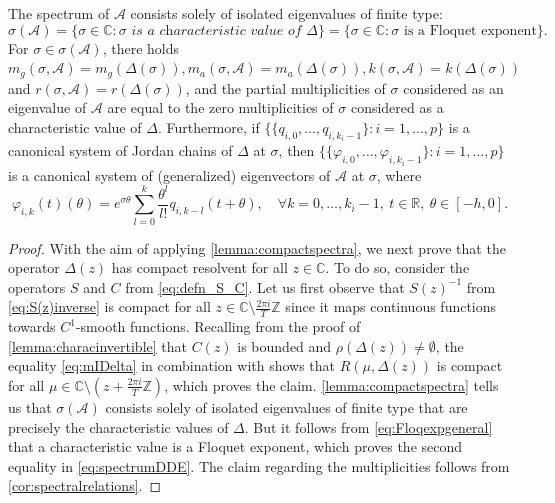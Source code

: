 \documentclass[english]{myarticle}
\begin{document}
\begin{sloppypar}
\begin{theorem} \label{thm:eigenfunctionsDDE}
The spectrum of $\mathcal{A}$ consists solely of isolated eigenvalues of finite type:
\begin{equation} \label{eq:spectrumDDE}
    \sigma(\mathcal{A}) =  \{ \sigma \in \mathbb{C} : \sigma \textit{ is a characteristic value of } \Delta \} = \{\sigma \in \mathbb{C} : \sigma \mbox{ is a Floquet exponent} \}.
\end{equation}
For $\sigma \in \sigma(\mathcal{A})$, there holds $m_g(\sigma,\mathcal{A}) = m_g(\Delta(\sigma)), m_a(\sigma,\mathcal{A}) = m_a(\Delta(\sigma)), k(\sigma,\mathcal{A}) = k(\Delta(\sigma))$ and $r(\sigma,\mathcal{A}) = r(\Delta(\sigma))$, and the partial multiplicities of $\sigma$ considered as an eigenvalue of $\mathcal{A}$ are equal to the zero multiplicities of $\sigma$ considered as a characteristic value of $\Delta$. Furthermore, if $\{ \{{q}_{i,0},\dots,{q}_{i,k_i-1} \} : i=1,\dots,p\}$ is a canonical system of Jordan chains of $\Delta$ at $\sigma$, then $\{ \{\varphi_{i,0},\dots,\varphi_{i,k_i-1} \} : i=1,\dots,p \}$ is a canonical system of (generalized) eigenvectors of $\mathcal{A}$ at $\sigma$, where
\begin{equation*}
    \varphi_{i,k}(t)(\theta) = e^{\sigma \theta} \sum_{l=0}^k \frac{\theta^l}{l!}q_{i,k-l}(t+\theta), \quad \forall k = 0,\dots,k_{i}-1, \ t \in \mathbb{R}, \ \theta \in [-h,0].
\end{equation*}
\end{theorem}
\begin{proof}
With the aim of applying \cref{lemma:compactspectra}, we next prove that the operator $\Delta(z)$ has compact resolvent for all $z \in \mathbb{C}$. To do so, consider the operators $S$ and $C$ from \eqref{eq:defn_S_C}. Let us first observe that $S(z)^{-1}$ from \eqref{eq:S(z)inverse} is compact for all $z \in \mathbb{C} \setminus \frac{2 \pi i }{T} \mathbb{Z}$ since it maps continuous functions towards $C^1$-smooth functions. Recalling from the proof of \cref{lemma:characinvertible} that $C(z)$ is bounded and $\rho(\Delta(z)) \neq \emptyset$, the equality \eqref{eq:mIDelta} in combination with \cite[Exercise II.4.30]{Engel2000} shows that $R(\mu,\Delta(z))$ is compact for all $\mu \in \mathbb{C} \setminus (z+\frac{2 \pi i}{T} \mathbb{Z})$, which proves the claim. \cref{lemma:compactspectra} tells us that $\sigma(\mathcal{A})$ consists solely of isolated eigenvalues of finite type that are precisely the characteristic values of $\Delta$. But it follows from \eqref{eq:Floqexpgeneral} that a characteristic value is a Floquet exponent, which proves the second equality in \eqref{eq:spectrumDDE}. The claim regarding the multiplicities follows from \cref{cor:spectralrelations}.


\end{proof}
\end{sloppypar}
\end{document}
